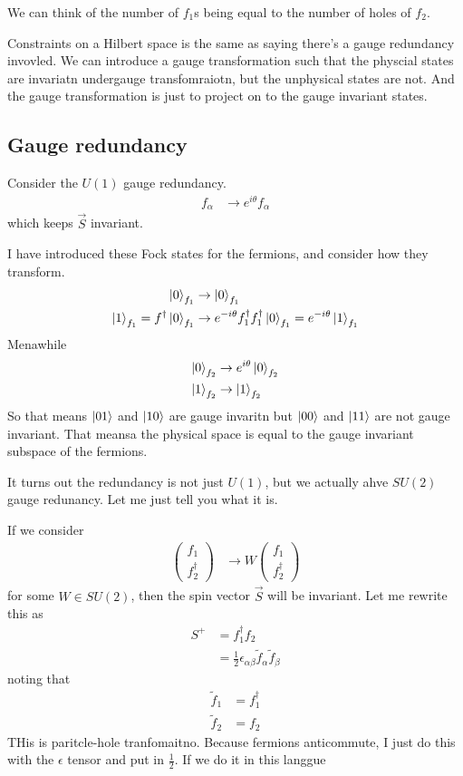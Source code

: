 We can think of the number of $f_1$s being equal to the number of holes of
$f_2$.

Constraints on a Hilbert space is the same as saying there's a gauge redundancy
invovled.
We can introduce a gauge transformation such that the physcial states are
invariatn undergauge transfomraiotn,
but the unphysical states are not.
And the gauge transformation is just to project on to the gauge invariant
states.

\subsection{Gauge redundancy}
Consider the $U(1)$ gauge redundancy.
\begin{align}
    f_{\alpha}
    &\to
    e^{i\theta} f_{\alpha}
\end{align}
which keeps $\vec{S}$ invariant.

I have introduced these Fock states for the fermions,
and consider how they transform.
\begin{align}
    \ket{0}_{f_1} &\to \ket{0}_{f_1}\\
    \ket{1}_{f_1} =
    f^\dagger \ket{0}_{f_1}
    &\to
    e^{-i\theta} f_1^\dagger f_1^\dagger \ket{0}_{f_1}
    =
    e^{-i\theta}\ket{1}_{f_1}
\end{align}
Menawhile
\begin{align}
    \ket{0}_{f_2} &\to e^{i\theta} \ket{0}_{f_2}\\
    \ket{1}_{f_2} &\to \ket{1}_{f_2}
\end{align}
So that means $\ket{01}$ and $\ket{10}$ are gauge invaritn but $\ket{00}$ and
$\ket{11}$ are not gauge invariant.
That meansa the physical space is equal to the gauge invariant subspace of the
fermions.

It turns out the redundancy is not just $U(1)$,
but we actually ahve $SU(2)$ gauge redunancy.
Let me just tell you what it is.

If we consider
\begin{align}
    \begin{pmatrix}
        f_1\\
        f_2^\dagger
    \end{pmatrix}
    &\to
    W
    \begin{pmatrix}
        f_1\\
        f_2^\dagger
    \end{pmatrix}
\end{align}
for some $W\in SU(2)$,
then the spin vector $\vec{S}$ will be invariant.
Let me rewrite this as
\begin{align}
    S^+
    &=
    f_1^\dagger f_2\\
    &=
    \frac{1}{2} \epsilon_{\alpha\beta} \tilde{f}_{\alpha} \tilde{f}_{\beta}
\end{align}
noting that
\begin{align}
    \tilde{f}_1 &= f_1^\dagger\\
    \tilde{f}_2 &= f_2
\end{align}
THis is paritcle-hole tranfomaitno.
Because fermions anticommute,
I just do this with the $\epsilon$ tensor and put in $\frac{1}{2}$.
If we do it in this langgue

